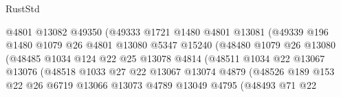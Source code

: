 \begin{lexlean}{RustStd}
\begin{coremodule}
                                  @4801
                                  @13082
                                  @49350
                                  (@49333
                                    @1721
                                    @1480
                                    @4801
                                    @13081
                                    (@49339
                                      @196
                                      @1480
                                      @1079
                                      @26
                                      @4801
                                      @13080
                                      @5347
                                      @15240
                                      (@48480
                                        @1079
                                        @26
                                        @13080
                                        (@48485
                                          @1034
                                          @124
                                          @22
                                          @25
                                          @13078
                                          @4814
                                          (@48511
                                            @1034
                                            @22
                                            @13067
                                            @13076
                                            (@48518
                                              @1033
                                              @27
                                              @22
                                              @13067
                                              @13074
                                              @4879
                                              (@48526
                                                @189
                                                @153
                                                @22
                                                @26
                                                @6719
                                                @13066
                                                @13073
                                                @4789
                                                @13049
                                                @4795
                                                (@48493
                                                  @71
                                                  @22

\end{coremodule}
\end{lexlean}
